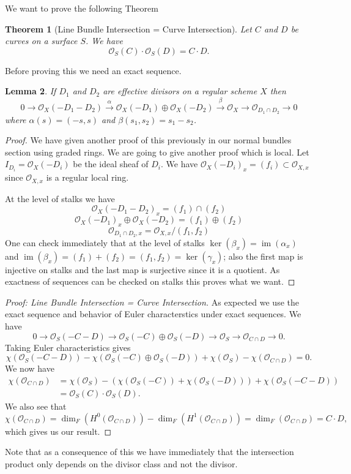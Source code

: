 \documentclass[12pt]{article}
\numberwithin{equation}{section}
\newtheorem{theorem}{Theorem}[subsection]
\newtheorem{lemma}[theorem]{Lemma}
\theoremstyle{definition}
\theoremstyle{remark}
\newcommand{\Ocal}{\mathcal{O}}
\newcommand{\im}{\operatorname{im}}
\begin{document}
We want to prove the following Theorem
\begin{theorem}[Line Bundle Intersection = Curve Intersection]
	Let $C$ and $D$ be curves on a surface $S$. 
	We have 
	 $$ \Ocal_S(C) \cdot \Ocal_S(D) = C\cdot D.$$
\end{theorem}

Before proving this we need an exact sequence. 
\begin{lemma}
If $D_1$ and $D_2$ are effective divisors on a regular scheme $X$ then 
 $$0 \to \Ocal_X(-D_1-D_2) \xrightarrow{\alpha} \Ocal_X(-D_1) \oplus \Ocal_X(-D_2) \xrightarrow{\beta} \Ocal_X \to \Ocal_{D_1\cap D_2} \to 0 $$
where $\alpha(s) = (-s,s)$ and $\beta(s_1,s_2) = s_1-s_2$. 
\end{lemma}
\begin{proof}
	We have given another proof of this previously in our normal bundles section using graded rings. 
	We are going to give another proof which is local. 
	Let $I_{D_i}=\Ocal_X(-D_i)$ be the ideal sheaf of $D_i$. 
	We have $\Ocal_X(-D_i)_x = (f_i) \subset \Ocal_{X,x}$ since $\Ocal_{X,x}$ is a regular local ring. 
	
	At the level of stalks we have 
	 $$\Ocal_X(-D_1-D_2)_x = (f_1) \cap (f_2) $$
	 $$\Ocal_X(-D_1)_x \oplus \Ocal_X(-D_2) = (f_1)\oplus (f_2) $$
	 $$\Ocal_{D_1\cap D_2,x} = \Ocal_{X,x}/(f_1,f_2) $$
	One can check immediately that at the level of stalks $\ker(\beta_x) = \im(\alpha_x)$ and $\im(\beta_x) = (f_1)+(f_2)=(f_1,f_2) = \ker(\gamma_x)$; also the first map is injective on stalks and the last map is surjective since it is a quotient. 
	As exactness of sequences can be checked on stalks this proves what we want. 
\end{proof}
 
\begin{proof}[Proof: Line Bundle Intersection = Curve Intersection]
As expected we use the exact sequence and behavior of Euler characterstics under exact sequences. 
We have 
$$0\to \Ocal_S(-C-D) \to \Ocal_S(-C) \oplus \Ocal_S(-D) \to \Ocal_S \to \Ocal_{C\cap D} \to 0. $$
Taking Euler characteristics gives 
$$\chi(\Ocal_S(-C-D)) - \chi( \Ocal_S(-C) \oplus \Ocal_S(-D)) + \chi(\Ocal_S) -\chi(\Ocal_{C\cap D})=0.$$
We now have 
\begin{align*}
\chi(\Ocal_{C\cap D}) &= \chi(\Ocal_S) - \left( \chi(\Ocal_S(-C)) + \chi(\Ocal_S(-D)) \right) + \chi( \Ocal_S(-C-D)) \\
&= \Ocal_S(C) \cdot \Ocal_S(D).
\end{align*}
We also see that 
$$\chi(\Ocal_{C\cap D}) = \dim_F(H^0(\Ocal_{C\cap D}))- \dim_F(H^1(\Ocal_{C\cap D}))= \dim_F(\Ocal_{C\cap D}) = C\cdot D,$$
which gives us our result. 
\end{proof}
Note that as a consequence of this we have immediately that the intersection product only depends on the divisor class and not the divisor.
\end{document}
